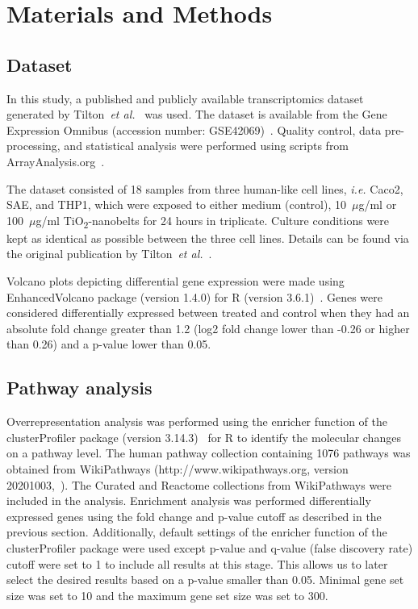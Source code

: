 \documentclass[ijms,article,submit,moreauthors,pdftex]{Definitions/mdpi}
\begin{document}
\section{Materials and Methods}

\subsection*{Dataset}
In this study, a published and publicly available transcriptomics dataset generated by Tilton~\textit{et al.}~\cite{Tilton2013} was used. The dataset is available from the Gene Expression Omnibus (accession number: GSE42069)~\cite{Edgar2002}. Quality control, data pre-processing, and statistical analysis were performed using scripts from ArrayAnalysis.org~\cite{Eijssen2013}. 

The dataset consisted of 18 samples from three human-like cell lines, \textit{i.e.} Caco2, SAE, and THP1, which were exposed to either medium (control), 10~$\mu$g/ml or 100~$\mu$g/ml TiO\textsubscript{2}-nanobelts for 24 hours in triplicate. Culture conditions were kept as identical as possible between the three cell lines. Details can be found via the original publication by Tilton~\textit{et al.}~\cite{Tilton2013}.

Volcano plots depicting differential gene expression were made using EnhancedVolcano package (version 1.4.0) for R (version 3.6.1)~\cite{R2020,VolcanoPlot}. Genes were considered differentially expressed between treated and control when they had an absolute fold change greater than 1.2 (log2 fold change lower than -0.26 or higher than 0.26) and a p-value lower than 0.05. 

\subsection*{Pathway analysis}
Overrepresentation analysis was performed using the enricher function of the clusterProfiler package (version 3.14.3)~\cite{Yu2012} for R to identify the molecular changes on a pathway level. The human pathway collection containing 1076 pathways was obtained from WikiPathways (http://www.wikipathways.org, version 20201003,~\cite{Martens2020}). The Curated and Reactome collections from WikiPathways were included in the analysis. Enrichment analysis was performed differentially expressed genes using the fold change and p-value cutoff as described in the previous section. Additionally, default settings of the enricher function of the clusterProfiler package were used except p-value and q-value (false discovery rate) cutoff were set to 1 to include all results at this stage. This allows us to later select the desired results based on a p-value smaller than 0.05. Minimal gene set size was set to 10 and the maximum gene set size was set to 300.
\end{document}
